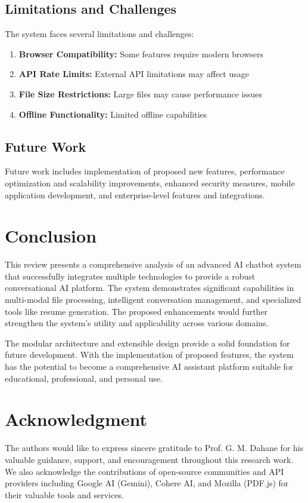\documentclass[conference]{IEEEtran}
\begin{document}
\subsection{Limitations and Challenges}
The system faces several limitations and challenges:
\begin{enumerate}[itemsep=0pt, parsep=0pt]
    \item \textbf{Browser Compatibility:} Some features require modern browsers
    \item \textbf{API Rate Limits:} External API limitations may affect usage
    \item \textbf{File Size Restrictions:} Large files may cause performance issues
    \item \textbf{Offline Functionality:} Limited offline capabilities
\end{enumerate}

\subsection{Future Work}
Future work includes implementation of proposed new features, performance optimization and scalability improvements, enhanced security measures, mobile application development, and enterprise-level features and integrations.

\section{Conclusion}
This review presents a comprehensive analysis of an advanced AI chatbot system that successfully integrates multiple technologies to provide a robust conversational AI platform. The system demonstrates significant capabilities in multi-modal file processing, intelligent conversation management, and specialized tools like resume generation. The proposed enhancements would further strengthen the system's utility and applicability across various domains.

The modular architecture and extensible design provide a solid foundation for future development. With the implementation of proposed features, the system has the potential to become a comprehensive AI assistant platform suitable for educational, professional, and personal use.

\section*{Acknowledgment}
The authors would like to express sincere gratitude to Prof. G. M. Dahane for his valuable guidance, support, and encouragement throughout this research work. We also acknowledge the contributions of open-source communities and API providers including Google AI (Gemini), Cohere AI, and Mozilla (PDF.js) for their valuable tools and services.
\end{document}
